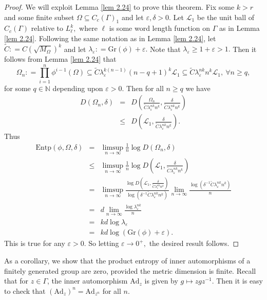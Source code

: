 \documentclass[a4paper,11pt,reqno]{amsart}
\theoremstyle{plain}
\theoremstyle{mainthmstyle}
\theoremstyle{named}
\numberwithin{equation}{section}
\newcommand{\Bea}{\begin{eqnarray*}}
\newcommand{\Eea}{\end{eqnarray*}}
\begin{document}
\begin{proof}
We will exploit Lemma \ref{lem 2.24} to prove this theorem. Fix some $k > r$ and some finite subset $\Omega \subseteq {C_c (\Gamma)}_1$ and let $\varepsilon, \delta > 0.$ Let $\mathcal L_{1}$ be the unit ball of $C_c (\Gamma)$ relative to $L_{\ell}^{k},$ where $\ell$ is some word length function on $\Gamma$ as in Lemma \ref{lem 2.24}. Following the same notation as in Lemma \ref{lem 2.24}, let $\widetilde {C} : = C \left (\sqrt {M_{\Omega}} \right)^{k}$ and let $\lambda_{\varepsilon} : = \mathrm{Gr}(\phi) + \varepsilon.$ Note that $\lambda_{\varepsilon} \geq 1 + \varepsilon > 1.$ Then it follows from Lemma \ref{lem 2.24} that $$\Omega_n : = \prod\limits_{i = 1}^{n} \phi^{i - 1} (\Omega) \subseteq \widetilde {C} \lambda_{\varepsilon}^{k (n - 1)} (n - q + 1)^k \mathcal L_1 \subseteq \widetilde {C} \lambda_{\varepsilon}^{n k} n^k \mathcal L_1,\ \forall n \geq q,$$ for some $q \in \mathbb N$ depending upon $\varepsilon > 0.$ Then for all $n \geq q$ we have
\Bea
D \left (\Omega_n, \delta \right ) & = & D \left (\frac {\Omega_n} {\widetilde{C} \lambda_{\varepsilon}^{nk} n^k}, \frac {\delta} {\widetilde{C} \lambda_{\varepsilon}^{nk} n^{k}} \right ) \\ & \leq & D \left (\mathcal L_1, \frac {\delta} {\widetilde{C} \lambda_{\varepsilon}^{nk} n^{k}} \right ).
\Eea
Thus
\Bea
\mathrm {Entp} (\phi, \Omega, \delta) & = & \limsup\limits_{n \to \infty} \frac {1} {n} \log D \left (\Omega_n, \delta \right ) \\ & \leq & \limsup\limits_{n \to \infty} \frac {1} {n} \log D \left (\mathcal L_1, \frac {\delta} {\widetilde{C} \lambda_{\varepsilon}^{nk} n^{k}} \right ) \\ & = & \limsup\limits_{n \to \infty} \frac {\log D \left (\mathcal L_1, \frac {\delta} {\widetilde{C} \lambda_{\varepsilon}^{n k} n^k} \right )} {\log \left (\delta^{-1} \widetilde{C} \lambda_{\varepsilon}^{n k} n^k \right )} \lim\limits_{n \to \infty} \frac {\log \left (\delta^{-1} \widetilde{C} \lambda_{\varepsilon}^{n k} n^k \right )} {n} \\ & = & d \lim\limits_{n \to \infty} \frac {\log \lambda_{\varepsilon}^{n k}} {n} \\ & = & k d \log \lambda_{\varepsilon} \\ & = & k d \log (\mathrm{Gr}(\phi) + \varepsilon).
\Eea
This is true for any $\varepsilon > 0.$ So letting $\varepsilon \to 0^{+},$ the desired result follows.
\end{proof}
As a corollary, we show that the product entropy of inner automorphisms of a finitely generated group are zero, provided the metric dimension is finite. Recall that for $z\in\Gamma$, the inner automorphism $\mathrm{Ad}_{z}$ is given by $g\mapsto zgz^{-1}$. Then it is easy to check that $(\mathrm{Ad}_{z})^n=\mathrm{Ad}_{z^n}$ for all $n$.
\end{document}

